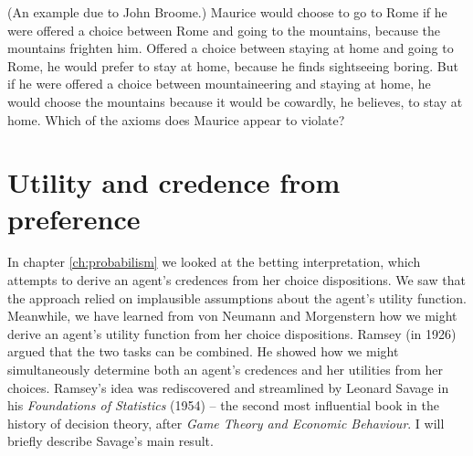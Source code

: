 
\begin{exercise}{1}
  (An example due to John Broome.) Maurice would choose to go to Rome
  if he were offered a choice between Rome and going to the mountains,
  because the mountains frighten him. Offered a choice between staying
  at home and going to Rome, he would prefer to stay at home, because
  he finds sightseeing boring. But if he were offered a choice between
  mountaineering and staying at home, he would choose the mountains
  because it would be cowardly, he believes, to stay at home. Which of
  the axioms does Maurice appear to violate?
\end{exercise}


\section{Utility and credence from preference}

In chapter \ref{ch:probabilism} we looked at the betting
interpretation, which attempts to derive an agent's credences from her
choice dispositions. We saw that the approach relied on implausible
assumptions about the agent's utility function. Meanwhile, we
have learned from von Neumann and Morgenstern how we might derive an
agent's utility function from her choice dispositions. Ramsey (in
1926) argued that the two tasks can be combined. He showed how we
might simultaneously determine both an agent's credences and her
utilities from her choices.%
%
%
Ramsey's idea was rediscovered and streamlined by Leonard Savage in
his \emph{Foundations of Statistics} (1954) -- the second most
influential book in the history of decision theory, after \emph{Game
  Theory and Economic Behaviour}. I will briefly describe Savage's
main result.

